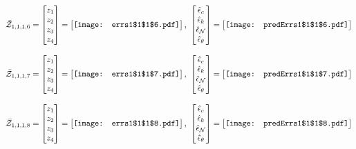 \documentclass[12pt]{article}
\begin{document}
\begin{gather*}
\bar{\mathcal{Z}}_{1,1,1,6}=\begin{bmatrix}
z_1\\
z_2\\
z_3\\
z_4
 \end{bmatrix}= \begin{bmatrix}
\vcenter{\hbox{\texttt{[image: errs1\$1\$1\$6.pdf]}}}
 \end{bmatrix},\,\, \begin{bmatrix}
\hat{\epsilon}_c\\\hat{\epsilon}_k\\\hat{\epsilon}_\mathcal{N}\\\hat{\epsilon}_\theta
 \end{bmatrix}=\begin{bmatrix}
\vcenter{\hbox{\texttt{[image: predErrs1\$1\$1\$6.pdf]}}}
 \end{bmatrix}
\end{gather*}


\begin{gather*}
\bar{\mathcal{Z}}_{1,1,1,7}=\begin{bmatrix}
z_1\\
z_2\\
z_3\\
z_4
 \end{bmatrix}= \begin{bmatrix}
\vcenter{\hbox{\texttt{[image: errs1\$1\$1\$7.pdf]}}}
 \end{bmatrix},\,\, \begin{bmatrix}
\hat{\epsilon}_c\\\hat{\epsilon}_k\\\hat{\epsilon}_\mathcal{N}\\\hat{\epsilon}_\theta
 \end{bmatrix}=\begin{bmatrix}
\vcenter{\hbox{\texttt{[image: predErrs1\$1\$1\$7.pdf]}}}
 \end{bmatrix}
\end{gather*}


\begin{gather*}
\bar{\mathcal{Z}}_{1,1,1,8}=\begin{bmatrix}
z_1\\
z_2\\
z_3\\
z_4
 \end{bmatrix}= \begin{bmatrix}
\vcenter{\hbox{\texttt{[image: errs1\$1\$1\$8.pdf]}}}
 \end{bmatrix},\,\, \begin{bmatrix}
\hat{\epsilon}_c\\\hat{\epsilon}_k\\\hat{\epsilon}_\mathcal{N}\\\hat{\epsilon}_\theta
 \end{bmatrix}=\begin{bmatrix}
\vcenter{\hbox{\texttt{[image: predErrs1\$1\$1\$8.pdf]}}}
 \end{bmatrix}
\end{gather*}
\end{document}
